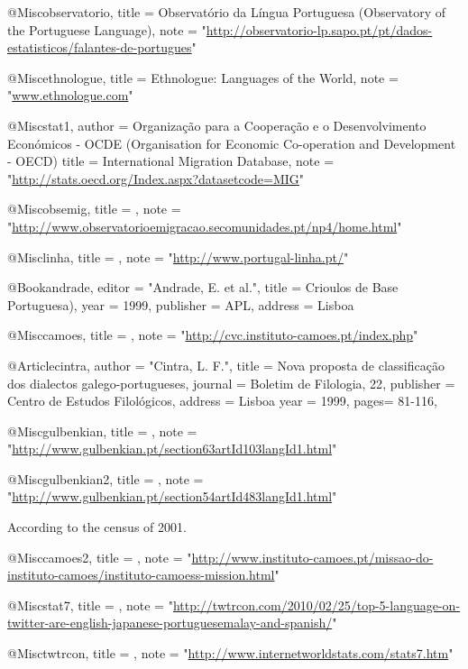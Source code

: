 @Misc{observatorio,
  title =	 {{Observatório da Língua Portuguesa (Observatory of the Portuguese Language)}},
  note =
                  "\url{http://observatorio-lp.sapo.pt/pt/dados-estatisticos/falantes-de-portugues}"
}

@Misc{ethnologue,
  title =	 {{Ethnologue: Languages of the World}},
  note =
                  "\url{www.ethnologue.com}"
}

@Misc{stat1,
  author = {Organização para a Cooperação e o Desenvolvimento Económicos - OCDE (Organisation for Economic Co-operation and Development - OECD)}
  title =      {{International Migration Database}},
  note =
                  "\url{http://stats.oecd.org/Index.aspx?datasetcode=MIG}"
}

@Misc{obsemig,
  title =	 {{}},
  note =
                  "\url{http://www.observatorioemigracao.secomunidades.pt/np4/home.html}"
}

@Misc{linha,
  title =	 {{}},
  note =
                  "\url{http://www.portugal-linha.pt/}"
}

@Book{andrade,
  editor =	 "Andrade, E. et al.",
  title =	 {{Crioulos de Base Portuguesa)}},
  year =	 1999,
  publisher = {APL},
  address =	 {Lisboa}
}

@Misc{camoes,
  title =	 {{}},
  note =
                  "\url{http://cvc.instituto-camoes.pt/index.php}"
}

@Article{cintra,
  author =	 "Cintra, L. F.",
  title =	 {{Nova proposta de classificação dos dialectos galego-portugueses}},
  journal = {Boletim de Filologia, 22},
  publisher = {Centro de Estudos Filológicos},
  address =	 {Lisboa}
  year =	 1999,
  pages=        81-116,
}

@Misc{gulbenkian,
  title =	 {{}},
  note =
                  "\url{http://www.gulbenkian.pt/section63artId103langId1.html}"
}

@Misc{gulbenkian2,
  title =	 {{}},
  note =
                  "\url{http://www.gulbenkian.pt/section54artId483langId1.html}"
}

\newblock According to the census of 2001.

@Misc{camoes2,
  title =	 {{}},
  note =
                  "\url{http://www.instituto-camoes.pt/missao-do-instituto-camoes/instituto-camoess-mission.html}"
}

@Misc{stat7,
  title =	 {{}},
  note =
                  "\url{http://twtrcon.com/2010/02/25/top-5-language-on-twitter-are-english-japanese-portuguesemalay-and-spanish/}"
}

@Misc{twtrcon,
  title =	 {{}},
  note =
                  "\url{http://www.internetworldstats.com/stats7.htm}"
}

